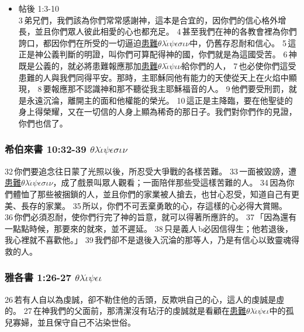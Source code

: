 \begin{itemize}
 \item{帖後 1:3-10}\\ 3 弟兄們，我們該為你們常常感謝神，這本是合宜的，因你們的信心格外增長，並且你們眾人彼此相愛的心也都充足。 4 甚至我們在神的各教會裡為你們誇口，都因你們在所受的一切逼迫\underline{患難$\theta$$\lambda$$\acute{\iota}$$\psi$$\epsilon$$\sigma$$\iota$$\nu$}中，仍舊存忍耐和信心。 5 這正是神公義判斷的明證，叫你們可算配得神的國，你們就是為這國受苦。 6 神既是公義的，就必將患難報應那加\underline{患難$\theta$$\lambda$$\tilde{\iota}$$\psi$$\iota$$\nu$}給你們的人， 7 也必使你們這受患難的人與我們同得平安。那時，主耶穌同他有能力的天使從天上在火焰中顯現， 8 要報應那不認識神和那不聽從我主耶穌福音的人。 9 他們要受刑罰，就是永遠沉淪，離開主的面和他權能的榮光。 10 這正是主降臨，要在他聖徒的身上得榮耀，又在一切信的人身上顯為稀奇的那日子。我們對你們作的見證，你們也信了。
\end{itemize}
       

\subsubsection{希伯來書 10:32-39 $\theta$$\lambda$$\acute{\iota}$$\psi$$\epsilon$$\sigma$$\iota$$\nu$} 
 32 你們要追念往日蒙了光照以後，所忍受大爭戰的各樣苦難。 33 一面被毀謗，遭\underline{患難$\theta$$\lambda$$\acute{\iota}$$\psi$$\epsilon$$\sigma$$\iota$$\nu$}，成了戲景叫眾人觀看；一面陪伴那些受這樣苦難的人。 34 因為你們體恤了那些被捆鎖的人，並且你們的家業被人搶去，也甘心忍受，知道自己有更美、長存的家業。 35 所以，你們不可丟棄勇敢的心，存這樣的心必得大賞賜。 36 你們必須忍耐，使你們行完了神的旨意，就可以得著所應許的。 37 「因為還有一點點時候，那要來的就來，並不遲延。 38 只是義人 b必因信得生；他若退後，我心裡就不喜歡他。」 39 我們卻不是退後入沉淪的那等人，乃是有信心以致靈魂得救的人。
  
 \subsubsection{雅各書 1:26-27 $\theta$$\lambda$$\acute{\iota}$$\psi$$\epsilon$$\iota$}   
 26 若有人自以為虔誠，卻不勒住他的舌頭，反欺哄自己的心，這人的虔誠是虛的。 27 在神我們的父面前，那清潔沒有玷汙的虔誠就是看顧在\underline{患難$\theta$$\lambda$$\acute{\iota}$$\psi$$\epsilon$$\iota$}中的孤兒寡婦，並且保守自己不沾染世俗。   
 
